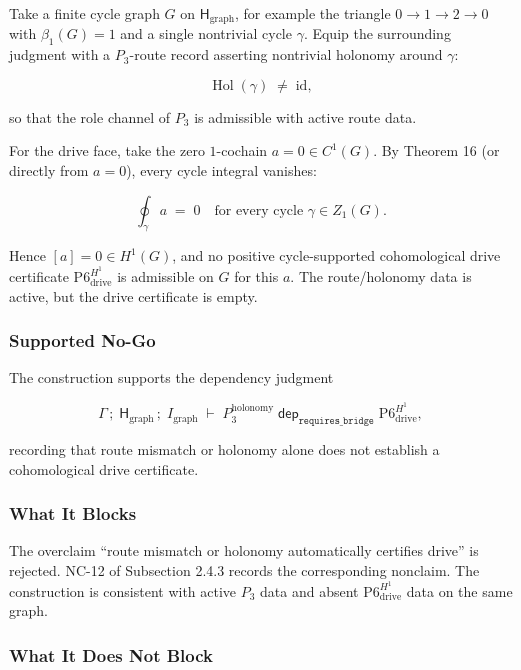 \documentclass[11pt]{article}
\theoremstyle{definition}
\begin{document}
Take a finite cycle graph \(G\) on \(\mathsf H_{\mathrm{graph}}\), for example the triangle \(0\to 1\to 2\to 0\) with \(\beta_1(G)=1\) and a single nontrivial cycle \(\gamma\). Equip the surrounding judgment with a \(P_3\)-route record asserting nontrivial holonomy around \(\gamma\):

\[
\operatorname{Hol}(\gamma)\;\neq\;\mathrm{id},
\]

so that the role channel of \(P_3\) is admissible with active route data.

For the drive face, take the zero \(1\)-cochain \(a=0\in C^1(G)\). By Theorem 16 (or directly from \(a=0\)), every cycle integral vanishes:

\[
\oint_\gamma a\;=\;0\quad\text{for every cycle }\gamma\in Z_1(G).
\]

Hence \([a]=0\in H^1(G)\), and no positive cycle-supported cohomological drive certificate \(\mathrm{P6}_{\mathrm{drive}}^{H^1}\) is admissible on \(G\) for this \(a\). The route/holonomy data is active, but the drive certificate is empty.

\subsubsection{Supported No-Go}

The construction supports the dependency judgment

\[
\Gamma\,;\;\mathsf H_{\mathrm{graph}}\,;\;I_{\mathrm{graph}}\;\vdash\;P_3^{\mathrm{holonomy}}\;\mathrel{\mathsf{dep}_{\texttt{requires\_bridge}}}\;\mathrm{P6}_{\mathrm{drive}}^{H^1},
\]

recording that route mismatch or holonomy alone does not establish a cohomological drive certificate.

\subsubsection{What It Blocks}

The overclaim ``route mismatch or holonomy automatically certifies drive'' is rejected. NC-12 of Subsection 2.4.3 records the corresponding nonclaim. The construction is consistent with active \(P_3\) data and absent \(\mathrm{P6}_{\mathrm{drive}}^{H^1}\) data on the same graph.

\subsubsection{What It Does Not Block}
\end{document}
